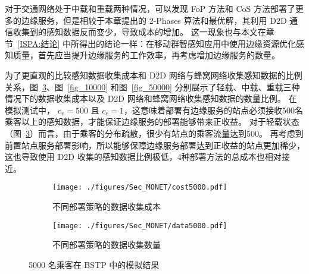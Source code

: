 对于交通网络处于中载和重载两种情况，可以发现 FoP 方法和 CoS 方法部署了更多的边缘服务，但是相较于本章提出的 2-Phases 算法和最优解，其利用 D2D 通信收集到的感知数据反而变少，导致成本的增加。
这一现象也与本文在章节~\ref{ISPA:结论} 中所得出的结论一样：在移动群智感知应用中使用边缘资源优化感知质量，首先应当提升边缘服务的工作效率，再考虑增加边缘服务的数量。

为了更直观的比较感知数据收集成本和 D2D 网络与蜂窝网络收集感知数据的比例关系，图~\ref{fig_5000}、图~\ref{fig_10000} 和图~\ref{fig_50000} 分别展示了轻载、中载、重载三种情况下的数据收集成本以及 D2D 网络和蜂窝网络收集感知数据的数量比例。
在模拟测试中， $c_v = 500$ 且 $c_c = 1$，这意味着部署有边缘服务的站点必须接收500名乘客以上的感知数据，才能保证边缘服务的部署能够带来正收益。
对于轻载状态（图~\ref{fig_5000}）而言，由于乘客的分布疏散，很少有站点的乘客流量达到500。
再考虑到前置站点服务部署影响，所以能够保障边缘服务部署达到正收益的站点更加稀少，这也导致使用 D2D 收集的感知数据比例极低，4种部署方法的总成本也相对接近。

\begin{figure}[!h]
  \vspace{-1em}
  \centering
  \begin{subfigure}[b]{0.45\linewidth}
    \texttt{[image: ./figures/Sec\_MONET/cost5000.pdf]}
    \label{fig_cost5000}
    \vspace{-2em}
    \caption{不同部署策略的数据收集成本}
  \end{subfigure}
  \begin{subfigure}[b]{0.45\linewidth}
    \texttt{[image: ./figures/Sec\_MONET/data5000.pdf]}
    \label{fig_data5000}
    \vspace{-2em}
    \caption{不同部署策略的数据收集数量}
  \end{subfigure}
    \vspace{-0.5em}
    \caption{5000 名乘客在 BSTP 中的模拟结果}
  \label{fig_5000}
  \vspace{-1em}
\end{figure}

